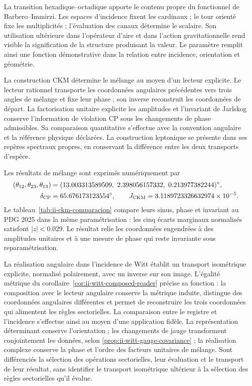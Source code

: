La transition hexadique--octadique apporte le contenu propre du
fonctionnel de Barbero--Immirzi. Les espaces d'incidence fixent les
cardinaux ; le tour orienté fixe les multiplicités ; l'évaluation
des canaux détermine le scalaire. Son utilisation ultérieure dans
l'opérateur d'aire et dans l'action gravitationnelle rend visible la signification
de la structure produisant la valeur. Le paramètre remplit ainsi une
fonction démonstrative dans la relation entre incidence, orientation et
géométrie.

La construction CKM détermine le mélange au moyen d’un lecteur explicite. Le
lecteur rationnel transporte les coordonnées angulaires précédentes vers trois
angles de mélange et fixe leur phase ; son inverse reconstruit les coordonnées
de départ. La factorisation unitaire explicite les amplitudes et
l’invariant de Jarlskog conserve l’information de violation CP sous les
changements de phase admissibles. Sa comparaison quantitative s’effectue avec
la convention angulaire et la référence physique déclarées. La construction
leptonique se présente dans ses repères spectraux propres, en conservant la
différence entre les deux transports d’espèce.

Les résultats de mélange sont exprimés numériquement par
\begin{align*}
 (\theta_{12},\theta_{23},\theta_{13})
   &=(13.003313589509,\ 2.398056157332,\ 0.213977382244)^\circ,\\
 \delta_{\rm CP}&=65.676173123554^\circ,\qquad
 J_{\rm CKM}=3.1189723326632974\times10^{-5}.
\end{align*}
Le tableau~\ref{tab:ii-ckm-comparacion} compare leurs sinus, phase et
invariant au PDG 2025 dans la même paramétrisation : les cinq
écarts marginaux normalisés satisfont $|z|<0.029$.
Le résultat relie les coordonnées engendrées à des amplitudes unitaires
et à une mesure de phase qui reste invariante sous reparamétrisation.

La réalisation angulaire dans l’incidence de Witt établit un transport
isométrique explicite, normalisé polairement, avec un inverse sur son image.
L’égalité métrique du corollaire~\ref{cor:ii-witt-composed-reader}
précise sa fonction : la composition avec le lecteur angulaire conserve la
métrique induite, distingue des coordonnées angulaires différentes et permet
de reconstruire les trois coordonnées qui alimentent les règles sectorielles.
La comparaison entre le registre et l’incidence s’effectue ainsi au moyen
d’une application fidèle. La représentation déterminant conserve
l’orientation ; les changements de jauge transforment conjointement les données,
selon \ref{prop:ii-witt-gauge-covariance} ; la réalisation complexe conserve
la phase et l’ordre des facteurs unitaires de mélange. Sont différenciés
la sélection des opérations sectorielles, leur évaluation et le transport
de leur résultat, sans identifier le transport isométrique ultérieur à la sélection des
règles sectorielles qu’il évalue.


